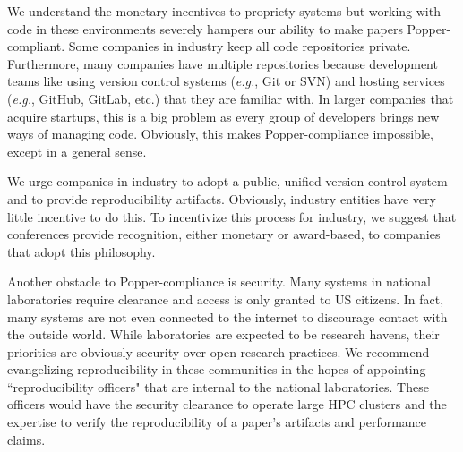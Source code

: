 We understand the monetary incentives to propriety systems but working with
code in these environments severely hampers our ability to make papers
Popper-compliant.  Some companies in industry keep all code repositories
private.  Furthermore, many companies have multiple repositories because
development teams like using version control systems ({\it e.g.}, Git or SVN)
and hosting services ({\it e.g.}, GitHub, GitLab, etc.) that they are familiar
with. In larger companies that acquire startups, this is a big problem as every
group of developers brings new ways of managing code.  Obviously, this makes
Popper-compliance impossible, except in a general sense.

We urge companies in industry to adopt a public, unified version control system
and to provide reproducibility artifacts. Obviously, industry entities have
very little incentive to do this. To incentivize this process for industry, we
suggest that conferences provide recognition, either monetary or award-based,
to companies that adopt this philosophy.

Another obstacle to Popper-compliance is security. Many systems in national
laboratories require clearance and access is only granted to US citizens. In
fact, many systems are not even connected to the internet to discourage contact
with the outside world. While laboratories are expected to be research havens,
their priorities are obviously security over open research practices. We
recommend evangelizing reproducibility in these communities in the hopes of
appointing ``reproducibility officers" that are internal to the national
laboratories. These officers would have the security clearance to operate large
HPC clusters and the expertise to verify the reproducibility of a paper's
artifacts and performance claims.

